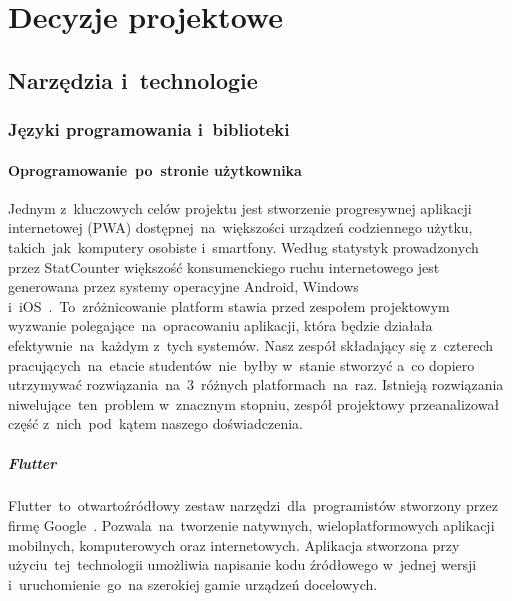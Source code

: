 
\chapter{Decyzje projektowe}
\label{ch:decyzje-projektowe}

\section{Narzędzia i~technologie}
\label{sec:narzedzia-i-technologie}

\subsection{Języki programowania i~biblioteki}
\label{subsec:jezyki-programowania-i-biblioteki}

\subsubsection{Oprogramowanie~po~stronie użytkownika}
Jednym z~kluczowych celów projektu jest stworzenie progresywnej aplikacji internetowej (PWA) dostępnej~na~większości urządzeń codziennego użytku, takich~jak~komputery osobiste i~smartfony.
Według statystyk prowadzonych przez StatCounter większość konsumenckiego ruchu internetowego jest generowana przez systemy operacyjne Android, Windows i~iOS~\cite{statcounter-os-shares}\@.~To~zróżnicowanie platform stawia przed zespołem projektowym wyzwanie polegające~na~opracowaniu aplikacji, która będzie działała efektywnie~na~każdym z~tych systemów.
Nasz zespół składający się z~czterech pracujących~na~etacie studentów~nie~byłby w~stanie stworzyć a~co dopiero utrzymywać rozwiązania~na~3~różnych platformach~na~raz.
Istnieją rozwiązania niwelujące~ten~problem w~znacznym stopniu, zespół projektowy przeanalizował część z~nich~pod~kątem naszego doświadczenia.

\paragraph{Flutter}
Flutter~to~otwartoźródłowy zestaw narzędzi~dla~programistów stworzony przez firmę Google~\cite{flutter-quick-start}.
Pozwala~na~tworzenie natywnych, wieloplatformowych aplikacji mobilnych, komputerowych oraz internetowych.
Aplikacja stworzona przy użyciu~tej~technologii umożliwia napisanie kodu źródłowego w~jednej wersji i~uruchomienie~go~na szerokiej gamie urządzeń docelowych.

